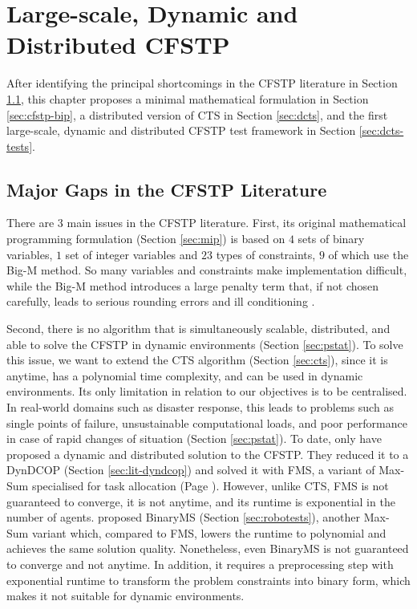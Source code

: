 \chapter{Large-scale, Dynamic and Distributed CFSTP}\label{chap:contrib2}

After identifying the principal shortcomings in the CFSTP literature in Section
\ref{sec:cfstp-gaps}, this chapter proposes a minimal mathematical formulation in Section
\ref{sec:cfstp-bip}, a distributed version of CTS in Section \ref{sec:dcts}, and the first
large-scale, dynamic and distributed CFSTP test framework in Section \ref{sec:dcts-tests}.

\section{Major Gaps in the CFSTP Literature}\label{sec:cfstp-gaps}

There are $3$ main issues in the CFSTP literature. First, its original mathematical
programming formulation (Section \ref{sec:mip}) is based on $4$ sets of binary variables,
$1$ set of integer variables and $23$ types of constraints, $9$ of which use the Big-M
method. So many variables and constraints make implementation difficult, while the Big-M
method introduces a large penalty term that, if not chosen carefully, leads to serious
rounding errors and ill conditioning \cite[Section $5.4.2$]{griva2009}.

Second, there is no algorithm that is simultaneously scalable, distributed, and able to
solve the CFSTP in dynamic environments (Section \ref{sec:pstat}). To solve this issue, we
want to extend the CTS algorithm (Section \ref{sec:cts}), since it is anytime, has a
polynomial time complexity, and can be used in dynamic environments. Its only limitation
in relation to our objectives is to be centralised. In real-world domains such as disaster
response, this leads to problems such as single points of failure, unsustainable
computational loads, and poor performance in case of rapid changes of situation (Section
\ref{sec:pstat}).
To date, only \cite{ramchurn2010fms} have proposed a dynamic and distributed solution to
the CFSTP. They reduced it to a DynDCOP (Section \ref{sec:lit-dyndcop}) and solved it with
FMS, a variant of Max-Sum specialised for task allocation (Page \pageref{sec:lit-fms}).
However, unlike CTS, FMS is not guaranteed to converge, it is not anytime, and its
runtime is exponential in the number of agents. \cite{pujol2015} proposed BinaryMS
(Section \ref{sec:robotests}), another Max-Sum variant which, compared to FMS, lowers the
runtime to polynomial and achieves the same solution quality. Nonetheless, even BinaryMS
is not guaranteed to converge and not anytime. In addition, it requires a preprocessing
step with exponential runtime to transform the problem constraints into binary form,
which makes it not suitable for dynamic environments.


